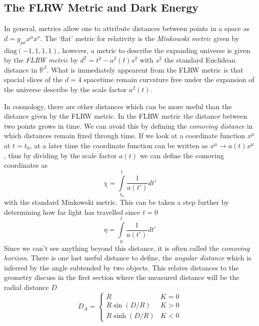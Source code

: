\subsection{The FLRW Metric and Dark Energy}
In general, metrics allow one to attribute distances between points in a space as $d = g_{\mu\nu}x^\mu x^\nu$. 
The `flat' metric for relativity is the \textit{Minkowski metric} given by $\text{diag}(-1,1,1,1)$, however, a metric to describe the expanding universe is given by the \textit{FLRW metric} by $d^2 = t^2-a^2(t)s^2$ with $s^2$ the standard Euclidean distance in $\mathbb{R}^3$. 
What is immediately appearent from the FLRW metric is that spacial slices of the $d=4$ spacetime remain curvature free under the expansion of the universe describe by the scale factor $a^2(t)$.

In cosmology, there are other distances which can be more useful than the distance given by the FLRW metric. In the FLRW metric the distance between two points grows in time. We can avoid this by defining the \textit{comoving distance} in which distances remain fixed through time. If we look at a coordinate function $x^\mu$ at $t=t_0$, at a later time the coordinate function can be written as $x^\mu \rightarrow a(t) x^\mu$, thus by dividing by the scale factor $a(t)$ we can define the comoving coordinates as
\begin{equation}
    \chi = \int\limits^{t}_{t_0} \frac{1}{a(t')} dt'
\end{equation}
with the standard Minkowski metric. This can be taken a step further by determining how far light has travelled since $t=0$
\begin{equation}
    \eta = \int\limits^t_0 \frac{1}{a(t')}dt'
\end{equation}
Since we can't see anything beyond this distance, it is often called the \textit{comoving horizon}. There is one last useful distance to define, the \textit{angular distance} which is inferred by the angle subtended by two objects. This relates distances to the geometry discuss in the first section where the measured distance will be the radial distance $D$
\begin{equation}
    D_A = \left\{ \begin{array}{cc}
	    R & K=0 \\
	    R\sin(D/R) & K>0 \\
	    R\sinh(D/R) & K<0
    \end{array}
    \right.
\end{equation}


